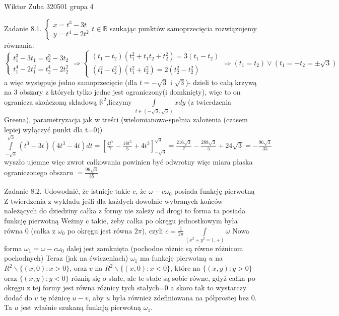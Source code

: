 \documentclass{article}
\begin{document}
Wiktor Zuba 320501 grupa 4
\newline

Zadanie 8.1.
\newline
\newline
$
\begin{cases}x=t^3-3t\\y=t^4-2t^2\end{cases} t\in\mathbb{R}
$ szukając punktów samoprzecięcia rozwiązujemy równania:\newline
$
\begin{cases}t_1^3-3t_1=t_2^3-3t_2\\t_1^4-2t_1^2=t_2^4-2t_2^2\end{cases}\Rightarrow
\begin{cases}(t_1-t_2)(t_1^2+t_1t_2+t_2^2)=3(t_1-t_2)\\(t_1^2-t_2^2)(t_1^2+t_2^2)=2(t_2^2-t_2^2)\end{cases}\Rightarrow
(t_1=t_2)\vee(t_1=-t_2=\pm\sqrt{3})
$a więc występuje jedno samoprzecięcie (dla $t=-\sqrt{3}$ i $\sqrt{3}$)- dzieli to całą krzywą na 3 obszary z których tylko jedne jest ograniczony(i domknięty),
więc to on ogranicza skończoną składową $\mathbb{R}^2$,\newline liczymy $\int\limits_{t\in (-\sqrt{3},\sqrt{3})}xdy$
(z twierdzenia Greena), parametryzacja jak w treści
(wielomianowa-spełnia założenia (czasem lepiej wyłączyć punkt dla t=0))
$
\int\limits_{-\sqrt{3}}^{\sqrt{3}}(t^3-3t)(4t^3-4t)dt=\left[\frac{4t^7}{7}-\frac{16t^5}{5}+4t^3\right]_{-\sqrt{3}}^{\sqrt{3}}
=
\frac{216\sqrt{3}}{7}-\frac{288\sqrt{3}}{5}+24\sqrt{3}=-\frac{96\sqrt{3}}{35}
$ wyszło ujemne więc zwrot całkowania powinien być odwrotny więc miara płaska ograniczonego obszaru $=\underline{\frac{96\sqrt{3}}{35}}$
\newline
\newline

Zadanie 8.2.
\newline
\newline
Udowodnić, że istnieje takie c, że $\omega-c\omega_{0}$ posiada funkcję pierwotną\newline
Z twierdzenia z wykładu jeśli dla każdych dowolnie wybranych końców należących do dziedziny całka z formy nie zależy od drogi
to forma ta posiada funkcję pierwotną\newline
Weżmy c takie, żeby całka po okręgu jednostkowym była równa 0 (całka z $\omega_0$ po okręgu jest równa $2\pi$), czyli
$
c=\frac{1}{2\pi}\int\limits_{(x^2+y^2=1,+)}\omega
$
Nowa forma $\omega_1=\omega-c\omega_0$ dalej jest zamknięta (pochodne różnic są równe różnicom pochodnych)\newline
Teraz (jak na ćwiczeniach) $\omega_1$ ma funkcję pierwotną $u$ na $R^2\backslash\{(x,0):x>0\}$, oraz $v$ na $R^2\backslash\{(x,0):x<0\}$,
które na $\{(x,y):y>0\}$ oraz $\{(x,y):y<0\}$ róznią się o stałe, ale te stałe są sobie równe, gdyż całka po okręgu z tej formy jest równa różnicy tych stałych=0
a skoro tak to wystarczy dodać do $v$ tę różnicę $u-v$, aby $u$ była również zdefiniowana na półprostej bez 0. Ta $u$ jest właśnie szukaną funkcją pierwotną $\omega_1$.
\newline
\newline
\end{document}
